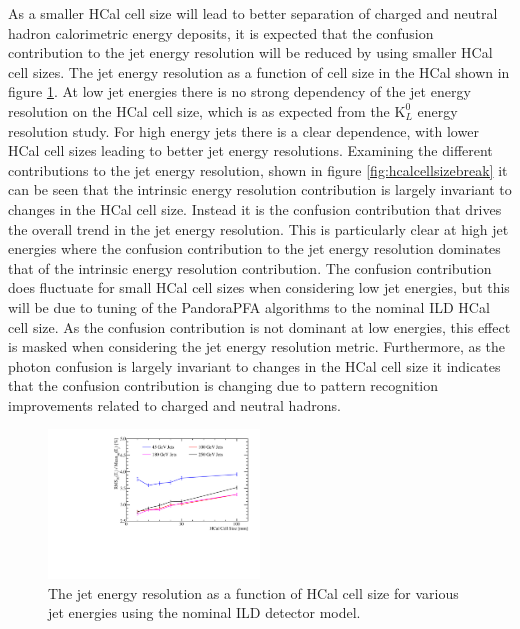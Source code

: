 As a smaller HCal cell size will lead to better separation of charged and neutral hadron calorimetric energy deposits, it is expected that the confusion contribution to the jet energy resolution will be reduced by using smaller HCal cell sizes.  The jet energy resolution as a function of cell size in the HCal shown in figure \ref{fig:hcalcellsize}.  At low jet energies there is no strong dependency of the jet energy resolution on the HCal cell size, which is as expected from the $\text{K}^{0}_{L}$ energy resolution study.  For high energy jets there is a clear dependence, with lower HCal cell sizes leading to better jet energy resolutions.  Examining the different contributions to the jet energy resolution, shown in figure \ref{fig:hcalcellsizebreak} it can be seen that the intrinsic energy resolution contribution is largely invariant to changes in the HCal cell size.  Instead it is the confusion contribution that drives the overall trend in the jet energy resolution.  This is particularly clear at high jet energies where the confusion contribution to the jet energy resolution dominates that of the intrinsic energy resolution contribution.  The confusion contribution does fluctuate for small HCal cell sizes when considering low jet energies, but this will be due to tuning of the PandoraPFA algorithms to the nominal ILD HCal cell size.  As the confusion contribution is not dominant at low energies, this effect is masked when considering the jet energy resolution metric.  Furthermore, as the photon confusion is largely invariant to changes in the HCal cell size it indicates that the confusion contribution is changing due to pattern recognition improvements related to charged and neutral hadrons.

\begin{figure}[h!]
\centering
\includegraphics[width=0.5\textwidth]{OptimisationStudies/Plots/JetEnergyResolutions/JER_vs_HCalCellSize.pdf}
\caption[The jet energy resolution as a function of HCal cell size for various jet energies using the nominal ILD detector model.]{The jet energy resolution as a function of HCal cell size for various jet energies using the nominal ILD detector model.}
\label{fig:hcalcellsize}
\end{figure}

